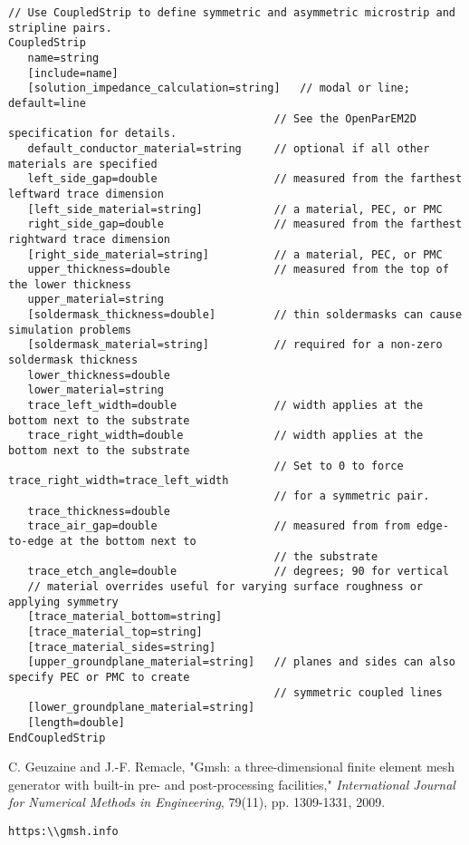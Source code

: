 \documentclass[titlepage]{article}
\renewcommand\_{\textunderscore\linebreak[1]}
\begin{document}
\begin{Verbatim}[fontsize=\small]
// Use CoupledStrip to define symmetric and asymmetric microstrip and stripline pairs.
CoupledStrip
   name=string
   [include=name]
   [solution_impedance_calculation=string]   // modal or line; default=line
                                         // See the OpenParEM2D specification for details.
   default_conductor_material=string     // optional if all other materials are specified
   left_side_gap=double                  // measured from the farthest leftward trace dimension
   [left_side_material=string]           // a material, PEC, or PMC
   right_side_gap=double                 // measured from the farthest rightward trace dimension
   [right_side_material=string]          // a material, PEC, or PMC
   upper_thickness=double                // measured from the top of the lower thickness
   upper_material=string
   [soldermask_thickness=double]         // thin soldermasks can cause simulation problems
   [soldermask_material=string]          // required for a non-zero soldermask thickness
   lower_thickness=double
   lower_material=string
   trace_left_width=double               // width applies at the bottom next to the substrate
   trace_right_width=double              // width applies at the bottom next to the substrate
                                         // Set to 0 to force trace_right_width=trace_left_width 
                                         // for a symmetric pair.
   trace_thickness=double
   trace_air_gap=double                  // measured from from edge-to-edge at the bottom next to 
                                         // the substrate
   trace_etch_angle=double               // degrees; 90 for vertical
   // material overrides useful for varying surface roughness or applying symmetry
   [trace_material_bottom=string]
   [trace_material_top=string]
   [trace_material_sides=string]
   [upper_groundplane_material=string]   // planes and sides can also specify PEC or PMC to create 
                                         // symmetric coupled lines
   [lower_groundplane_material=string]
   [length=double]
EndCoupledStrip

\end{Verbatim}

\begin{thebibliography}{unsrt}

 C. Geuzaine and J.-F. Remacle, "Gmsh: a three-dimensional finite element mesh generator with built-in pre- and post-processing facilities," \textit{International Journal for Numerical Methods in Engineering}, 79(11), pp. 1309-1331, 2009.

 \verb+https:\\gmsh.info+

\end{thebibliography}
\end{document}
